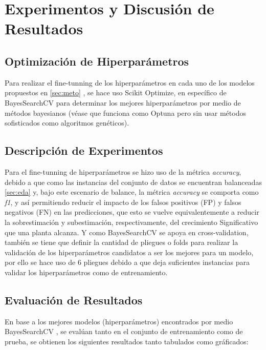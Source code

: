 \documentclass[12pt,a4paper]{article}
\begin{document}
    \section{Experimentos y Discusión de Resultados}
    {
        \subsection{Optimización de Hiperparámetros}
        {            
            Para realizar el fine-tunning de los hiperparámetros en cada uno de los modelos 
            propuestos en \ref{sec:meto} , se hace uso Scikit Optimize, en 
            específico de BayesSearchCV \cite{skopt_bayes} para determinar los mejores hiperparámetros 
            por medio de métodos bayesianos (véase que funciona como Optuna \cite{optuna} pero 
            sin usar métodos sofisticados como algoritmos genéticos).
        }

        \subsection{Descripción de Experimentos}
        {
            Para el fine-tunning de hiperparámetros se hizo uso de la métrica \emph{accuracy}, debido 
            a que como las instancias del conjunto de datos se encuentran balanceadas \ref{sec:eda}  
            y, bajo este escenario de balance, la métrica \emph{accuracy} se comporta como \emph{f1}, 
            y así permitiendo reducir el impacto de los falsos positivos (FP) y falsos negativos (FN) en 
            las predicciones, que esto se vuelve equivalentemente a reducir la sobrestimación y 
            subestimación, respectivamente, del crecimiento Significativo que una planta alcanza. 
            Y como BayesSearchCV \cite{skopt_bayes} se apoya en cross-validation, también se tiene 
            que definir la cantidad de pliegues o folds para realizar la validación de los hiperparámetros 
            candidatos a ser los mejores para un modelo, por ello se hace uso de $6$ pliegues debido a 
            que deja suficientes instancias para validar los hiperparámetros como de entrenamiento.   
        }

        \subsection{Evaluación de Resultados}
        {
            En base a los mejores modelos (hiperparámetros) encontrados por medio BayesSearchCV \cite{skopt_bayes}, 
            se evalúan tanto en el conjunto de entrenamiento como de prueba, se obtienen los siguientes 
            resultados tanto tabulados como gráficados:
            
}}
\end{document}

